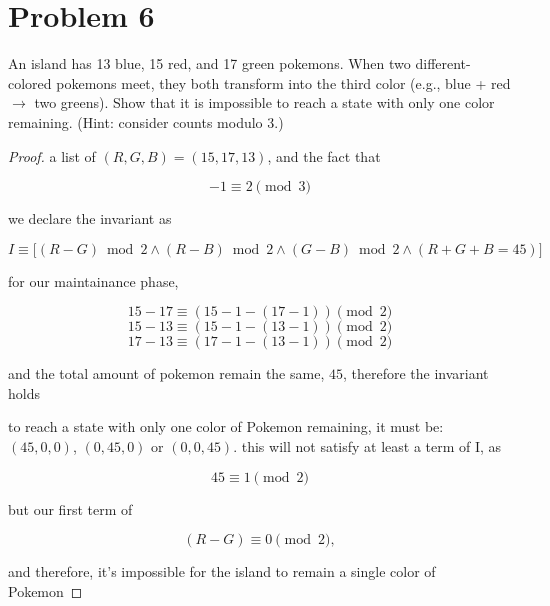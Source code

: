 \vspace{1em}
\hrulefill

\section*{Problem 6}
An island has 13 blue, 15 red, and 17 green pokemons. When two different-colored pokemons meet, they both transform into the third color (e.g., blue + red $\rightarrow$ two greens). Show that it is impossible to reach a state with only one color remaining. (Hint: consider counts modulo 3.)
\medskip
\solution

\begin{proof}
a list of $(R, G, B) = (15, 17, 13)$, and the fact that

\[
-1 \equiv 2 \pmod 3
\]

we declare the invariant as

\[
I \equiv \big[(R - G) \bmod 2 \land (R - B) \bmod 2 \land (G
- B) \bmod 2 \land (R + G + B = 45)\big]
\]

for our maintainance phase,

\[
15 - 17 \equiv (15 - 1 - (17 - 1)) \pmod 2
\]
\[
15 - 13 \equiv (15 - 1 - (13 - 1)) \pmod 2
\]
\[
17 - 13 \equiv (17 - 1 - (13 - 1)) \pmod 2
\]

and the total amount of pokemon remain the same, $45$,
therefore the invariant holds

\vspace{1em}

to reach a state with only one color of Pokemon remaining,
it must be: $(45, 0, 0)$, $(0, 45, 0)$ or $(0, 0, 45)$. this
will not satisfy at least a term of I, as

\[
45 \equiv 1 \pmod 2
\]

but our first term of

\[
(R - G) \equiv 0 \pmod 2,
\]

and therefore, it's impossible for the island to remain a
single color of Pokemon
\end{proof}

\vspace{1em}
\hrulefill

